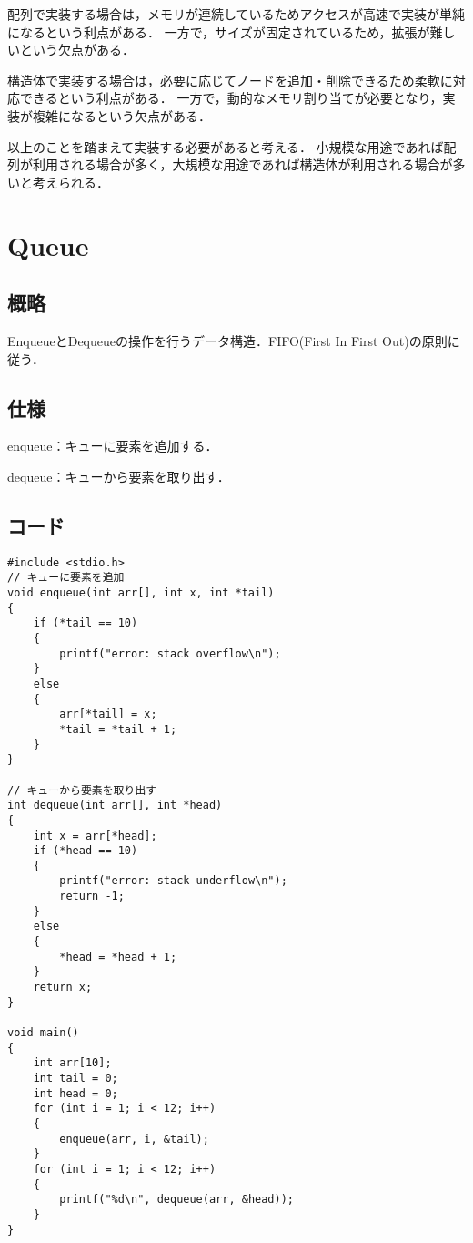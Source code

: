 \documentclass{ltjsarticle}
\begin{document}
配列で実装する場合は，メモリが連続しているためアクセスが高速で実装が単純になるという利点がある．
一方で，サイズが固定されているため，拡張が難しいという欠点がある．

構造体で実装する場合は，必要に応じてノードを追加・削除できるため柔軟に対応できるという利点がある．
一方で，動的なメモリ割り当てが必要となり，実装が複雑になるという欠点がある．

以上のことを踏まえて実装する必要があると考える．
小規模な用途であれば配列が利用される場合が多く，大規模な用途であれば構造体が利用される場合が多いと考えられる．

\section{Queue}
\subsection{概略}
EnqueueとDequeueの操作を行うデータ構造．FIFO(First In First Out)の原則に従う．

\subsection{仕様}
\noindent enqueue：キューに要素を追加する．

\noindent dequeue：キューから要素を取り出す．

\subsection{コード}
\begin{lstlisting}[frame=single, lineskip=-5pt]
#include <stdio.h>
// キューに要素を追加
void enqueue(int arr[], int x, int *tail)
{
    if (*tail == 10)
    {
        printf("error: stack overflow\n");
    }
    else
    {
        arr[*tail] = x;
        *tail = *tail + 1;
    }
}

// キューから要素を取り出す
int dequeue(int arr[], int *head)
{
    int x = arr[*head];
    if (*head == 10)
    {
        printf("error: stack underflow\n");
        return -1;
    }
    else
    {
        *head = *head + 1;
    }
    return x;
}

void main()
{
    int arr[10];
    int tail = 0;
    int head = 0;
    for (int i = 1; i < 12; i++)
    {
        enqueue(arr, i, &tail);
    }
    for (int i = 1; i < 12; i++)
    {
        printf("%d\n", dequeue(arr, &head));
    }
}
\end{lstlisting}
\end{document}
